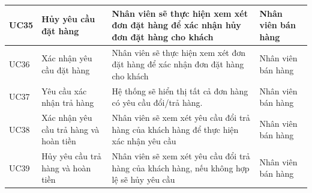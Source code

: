 \documentclass[12pt,a4paper,2sides]{report}
\begin{document}
\begin{tabular}{|p{1cm}|p{3cm}|p{6cm}|p{3cm}|}
\hline
UC35 & Hủy yêu cầu đặt hàng                   & Nhân viên sẽ thực hiện xem xét đơn đặt hàng để xác nhận hủy đơn đặt hàng cho khách                                                                                                                                                       & Nhân viên bán hàng                                                      \\ 
\hline
UC36 & Xác nhận yêu cầu đặt hàng              & Nhân viên sẽ thực hiện xem xét đơn đặt hàng để xác nhận đơn đặt hàng cho khách                                                                                                                                                           & Nhân viên bán hàng                                                      \\ 
\hline
UC37 & Yêu cầu xác nhận trả hàng              & Hệ thống sẽ hiển thị tất cả đơn hàng có yêu cầu đổi/trả hàng.                                                                                                                                                                            & Nhân viên bán hàng                                                      \\ 
\hline
UC38 & Xác nhận yêu cầu trả hàng và hoàn tiền & Nhân viên sẽ xem xét yêu cầu đổi trả hàng của khách hàng để thực hiện xác nhận yêu cầu                                                                                                                                                   & Nhân viên bán hàng                                                      \\ 
\hline
UC39 & Hủy yêu cầu trả hàng và hoàn tiền      & Nhân viên sẽ xem xét yêu cầu đổi trả hàng của khách hàng, nếu không hợp lệ sẽ hủy yêu cầu                                                                                                                                                & Nhân viên bán hàng                                                      \\ 
\hline
\end{tabular}\\
\end{document}
